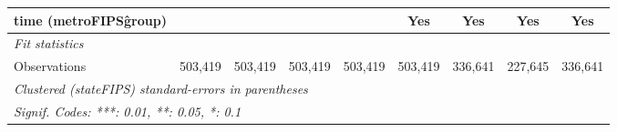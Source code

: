 \begin{tabular}{lcccccccc}
   time (metroFIPS\^group)  &                 &                 &                 &                 & Yes            & Yes            & Yes            & Yes\\  
   \midrule
   \emph{Fit statistics}\\
   Observations             & 503,419         & 503,419         & 503,419         & 503,419         & 503,419        & 336,641        & 227,645        & 336,641\\  
   \midrule \midrule
   \multicolumn{9}{l}{\emph{Clustered (stateFIPS) standard-errors in parentheses}}\\
   \multicolumn{9}{l}{\emph{Signif. Codes: ***: 0.01, **: 0.05, *: 0.1}}\\
\end{tabular}
\par\endgroup


